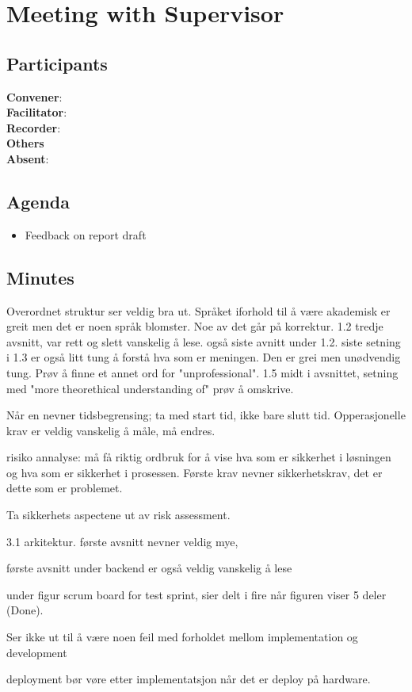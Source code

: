 \section*{Meeting with Supervisor}

\subsection*{Participants}

\textbf{Convener}: \supervisor{}        \\
\textbf{Facilitator}: \groupleader{}    \\
\textbf{Recorder}: \scrummaster{}       \\
\textbf{Others}                         \\
\textbf{Absent}: \facilitator{}

\subsection*{Agenda}
\begin{itemize}
    \item Feedback on report draft

\end{itemize}

\subsection*{Minutes}

Overordnet struktur ser veldig bra ut. Språket iforhold til å være akademisk er greit men det er noen språk blomster. Noe av det går på korrektur. 1.2 tredje avsnitt, var rett og slett vanskelig å lese. også siste avnitt under 1.2. siste setning i 1.3 er også litt tung å forstå hva som er meningen. Den er grei men unødvendig tung. Prøv å finne et annet ord for "unprofessional". 1.5 midt i avsnittet, setning med "more theorethical understanding of" prøv å omskrive. 

Når en nevner tidsbegrensing; ta med start tid, ikke bare slutt tid.
Opperasjonelle krav er veldig vanskelig å måle, må endres.  

risiko annalyse: må få riktig ordbruk for å vise hva som er sikkerhet i løsningen og hva som er sikkerhet i prosessen. Første krav nevner sikkerhetskrav, det er dette som er problemet. 

Ta sikkerhets aspectene ut av risk assessment.

3.1 arkitektur. første avsnitt nevner veldig mye, 

første avsnitt under backend er også veldig vanskelig å lese

under figur scrum board for test sprint, sier delt i fire når figuren viser 5 deler (Done).

Ser ikke ut til å være noen feil med forholdet mellom  implementation og development

deployment bør vøre etter implementatsjon når det er deploy på hardware.
\newpage